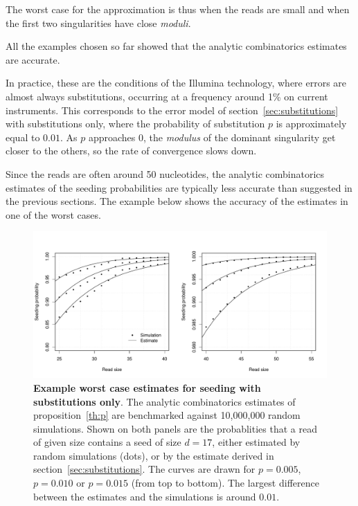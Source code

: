 \documentclass{article}
\begin{document}
The worst case for the approximation is thus when the reads are
small and when the first two singularities have close \textit{moduli}.

All the examples chosen so far showed that the analytic combinatorics
estimates are accurate.

In practice, these are the conditions of the Illumina technology, where
errors are almost always substitutions, occurring at a frequency around
1\% on current instruments. This corresponds to the error model of
section~\ref{sec:substitutions} with substitutions only, where the
probability of substitution $p$ is approximately equal to $0.01$. As $p$
approaches $0$, the \textit{modulus} of the dominant singularity get
closer to the others, so the rate of convergence slows down.

Since the reads are often around 50 nucleotides, the analytic
combinatorics estimates of the seeding probabilities are typically less
accurate than suggested in the previous sections. The example below shows
the accuracy of the estimates in one of the worst cases.


\begin{figure}[h]
\centering
\includegraphics[scale=0.445]{simulp_short.pdf}
\caption{\textbf{Example worst case estimates for seeding with
substitutions only}. The analytic combinatorics estimates of
proposition~\ref{th:p} are benchmarked against 10,000,000 random
simulations. Shown on both panels are the probablities that a read of
given size contains a seed of size $d=17$, either estimated by random
simulations (dots), or by the estimate derived in
section~\ref{sec:substitutions}. The curves are drawn for $p=0.005$,
$p=0.010$ or $p=0.015$ (from top to bottom). The largest difference
between the estimates and the simulations is around $0.01$.}
\label{fig:simulp_short}
\end{figure}
\end{document}

